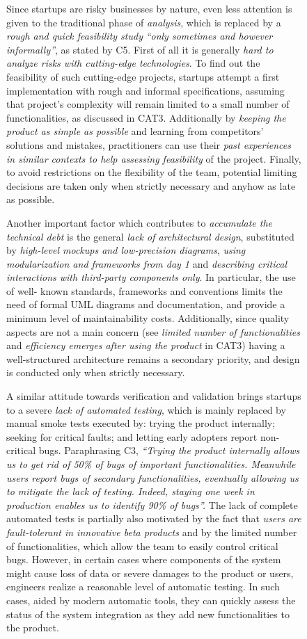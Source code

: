 \documentclass[12pt,journal,compsoc]{../sty/IEEEtran}
\begin{document}
\begin{table}[!t]
\begin{figure}[!t]
\begin{compactitem}
Since startups are risky businesses by nature, even less attention is given to
the traditional phase of \textit{analysis}, which is replaced by a \textit{rough
and quick feasibility study}   \textit{``only sometimes and however
informally''}, as stated by C5.  First of all it is generally \textit{hard to
analyze risks with cutting-edge technologies}. To find out the feasibility of
such cutting-edge projects, startups attempt a first implementation with rough
and informal specifications, assuming that project's complexity will remain
limited to a small number of functionalities, as discussed in CAT3. Additionally
by \textit{keeping the product as simple as possible} and learning from
competitors' solutions and mistakes, practitioners can use their \textit{past
experiences in similar contexts to help assessing feasibility} of the project.
Finally, to avoid restrictions on the flexibility of the team, potential
limiting decisions are taken only when strictly necessary and anyhow as late as
possible.

Another important factor which contributes to \textit{accumulate the technical
debt} is the general \textit{lack of architectural design}, substituted by
\textit{high-level mockups and low-precision diagrams}, \textit{using
modularization and frameworks from day 1} and \textit{describing critical
interactions with third-party components only}. In particular, the use of  well-
known standards, frameworks and conventions limits the need of formal UML
\cite{UML} diagrams and documentation, and provide a minimum level of
maintainability costs. Additionally, since quality aspects are not a main
concern (see \textit{limited number of functionalities} and \textit{efficiency
emerges after using the product} in CAT3) having a well-structured architecture
remains a secondary priority, and design is conducted only when strictly
necessary.

A similar attitude towards verification and validation brings startups to a
severe \textit{lack of automated testing}, which is mainly replaced by manual
smoke tests executed by: trying the product internally; seeking for critical
faults; and letting early adopters report non-critical bugs.  Paraphrasing C3,
\textit{``Trying the product internally allows us to get rid of 50\% of bugs of
important functionalities. Meanwhile users report bugs of secondary
functionalities, eventually allowing us to mitigate the lack of testing. Indeed,
staying one week in production enables us to identify 90\% of bugs''.} The lack
of complete automated tests is partially also motivated by the fact that
\textit{users are fault-tolerant in innovative beta products} and  by the
limited number of functionalities, which allow the team to easily control
critical bugs. However, in certain cases where components of the system might
cause loss of data or severe damages to the product or users, engineers realize
a reasonable level of automatic testing. In such cases, aided by modern
automatic tools, they can quickly assess the status of the system integration as
they add new functionalities to the product.


\end{compactitem}
\end{figure}
\end{table}
\end{document}
